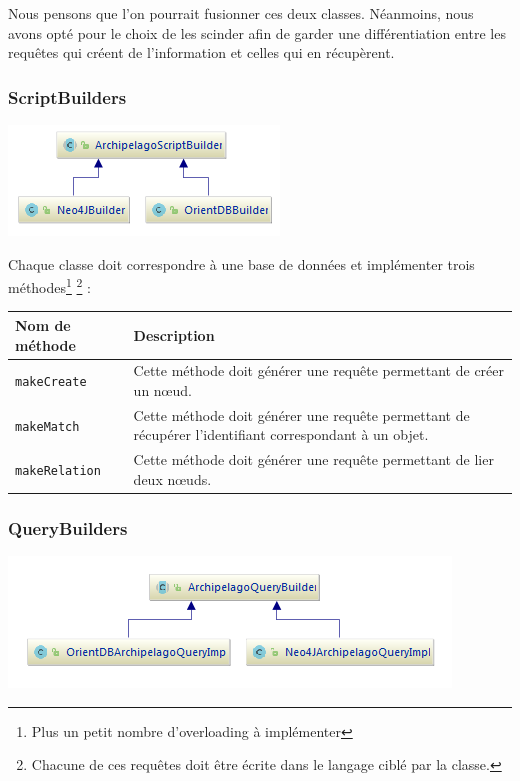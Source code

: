 \documentclass[a4paper,fleqn,12pt]{report}
\begin{document}
Nous pensons que l'on pourrait fusionner ces deux classes. Néanmoins, nous avons opté pour le choix de les scinder afin de garder une différentiation entre les requêtes qui créent de l'information et celles qui en récupèrent.


\subsubsection{ScriptBuilders}


\begin{center}
\includegraphics[scale=1.5]{figures/scriptBuilders.png}
\label{fig:ScriptQuery}
\end{center}

Chaque classe doit correspondre à une base de données et implémenter trois méthodes\footnote{Plus un petit nombre d'overloading à implémenter} \footnote{Chacune de ces requêtes doit être écrite dans le langage ciblé par la classe.} :

\begin{tabular}[c]{|l|M{12cm}|}

\hline
\textbf{Nom de méthode} & \textbf{Description}  \tabularnewline
\hline
\texttt{makeCreate} &  Cette méthode doit générer une requête permettant de créer un nœud. \tabularnewline
\hline
\texttt{makeMatch} & Cette méthode doit générer une requête permettant de récupérer l'identifiant correspondant à un objet. \tabularnewline
\hline
\texttt{makeRelation} &  Cette méthode doit générer une requête permettant de lier deux nœuds.  \tabularnewline
\hline

\end{tabular}

\subsubsection{QueryBuilders}

\begin{center}
\includegraphics[scale=1.5]{figures/queryBuilders.png}
\label{fig:QueryBuilders}
\end{center}
\end{document}
